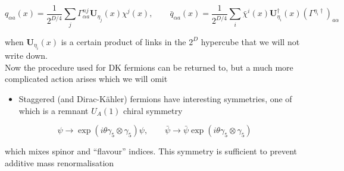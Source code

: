 \begin{equation}
q_{\alpha a}(x)=\frac{1}{2^{D / 4}} \sum_{j} \Gamma_{\alpha a}^{n j} \mathbf{U}_{\eta_{j}}(x) \chi^{j}(x), \qquad \bar{q}_{\alpha a}(x)=\frac{1}{2^{D / 4}} \sum_{i} \bar{\chi}^{i}(x) \mathbf{U}_{\eta_{i}}^{\dagger}(x)\left(\Gamma^{\eta_{i}{\dagger}}\right)_{a \alpha}
\end{equation}

when \(\mathbf{U}_{\eta_{i}}(x)\) is a certain product of links in the \(2^{D}\) hypercube that we will not write down.\\
Now the procedure used for DK fermions can be returned to, but a much more complicated action arises which we will omit

\begin{itemize}
  \item Staggered (and Dirac-K\"ahler) fermions have interesting symmetries, one of which is a remnant \(U_{A}(1)\) chiral symmetry
\end{itemize}

\begin{equation}
\psi \rightarrow \exp \left(i \theta {\gamma_{5}} \otimes \gamma_{5}\right) \psi, \qquad \bar{\psi} \rightarrow \bar{\psi} \exp \left(i \theta{\gamma_5} \otimes \gamma_{5}\right)
\end{equation}

which mixes spinor and ``flavour'' indices.
This symmetry is sufficient to prevent additive mass renormalisation

